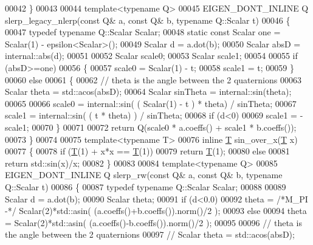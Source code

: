\begin{DoxyCode}
00042 \}
00043 
00044 \textcolor{keyword}{template}<\textcolor{keyword}{typename} Q>
00045 EIGEN\_DONT\_INLINE Q slerp\_legacy\_nlerp(\textcolor{keyword}{const} Q& a, \textcolor{keyword}{const} Q& b, \textcolor{keyword}{typename} Q::Scalar t)
00046 \{
00047   \textcolor{keyword}{typedef} \textcolor{keyword}{typename} Q::Scalar Scalar;
00048   \textcolor{keyword}{static} \textcolor{keyword}{const} Scalar one = Scalar(1) - epsilon<Scalar>();
00049   Scalar d = a.dot(b);
00050   Scalar absD = internal::abs(d);
00051   
00052   Scalar scale0;
00053   Scalar scale1;
00054   
00055   \textcolor{keywordflow}{if} (absD>=one)
00056   \{
00057     scale0 = Scalar(1) - t;
00058     scale1 = t;
00059   \}
00060   \textcolor{keywordflow}{else}
00061   \{
00062     \textcolor{comment}{// theta is the angle between the 2 quaternions}
00063     Scalar theta = std::acos(absD);
00064     Scalar sinTheta = internal::sin(theta);
00065 
00066     scale0 = internal::sin( ( Scalar(1) - t ) * theta) / sinTheta;
00067     scale1 = internal::sin( ( t * theta) ) / sinTheta;
00068     \textcolor{keywordflow}{if} (d<0)
00069       scale1 = -scale1;
00070   \}
00071 
00072   \textcolor{keywordflow}{return} Q(scale0 * a.coeffs() + scale1 * b.coeffs());
00073 \}
00074 
00075 \textcolor{keyword}{template}<\textcolor{keyword}{typename} T>
00076 \textcolor{keyword}{inline} \hyperlink{group___sparse_core___module}{T} sin\_over\_x(\hyperlink{group___sparse_core___module}{T} x)
00077 \{
00078   \textcolor{keywordflow}{if} (\hyperlink{group___sparse_core___module}{T}(1) + x*x == \hyperlink{group___sparse_core___module}{T}(1))
00079     \textcolor{keywordflow}{return} \hyperlink{group___sparse_core___module}{T}(1);
00080   \textcolor{keywordflow}{else}
00081     \textcolor{keywordflow}{return} std::sin(x)/x;
00082 \}
00083 
00084 \textcolor{keyword}{template}<\textcolor{keyword}{typename} Q>
00085 EIGEN\_DONT\_INLINE Q slerp\_rw(\textcolor{keyword}{const} Q& a, \textcolor{keyword}{const} Q& b, \textcolor{keyword}{typename} Q::Scalar t)
00086 \{
00087   \textcolor{keyword}{typedef} \textcolor{keyword}{typename} Q::Scalar Scalar;
00088   
00089   Scalar d = a.dot(b);
00090   Scalar theta;
00091   \textcolor{keywordflow}{if} (d<0.0)
00092     theta = \textcolor{comment}{/*M\_PI -*/} Scalar(2)*std::asin( (a.coeffs()+b.coeffs()).norm()/2 );
00093   \textcolor{keywordflow}{else}
00094     theta = Scalar(2)*std::asin( (a.coeffs()-b.coeffs()).norm()/2 );
00095   
00096   \textcolor{comment}{// theta is the angle between the 2 quaternions}
00097 \textcolor{comment}{//   Scalar theta = std::acos(absD);}

\end{DoxyCode}
